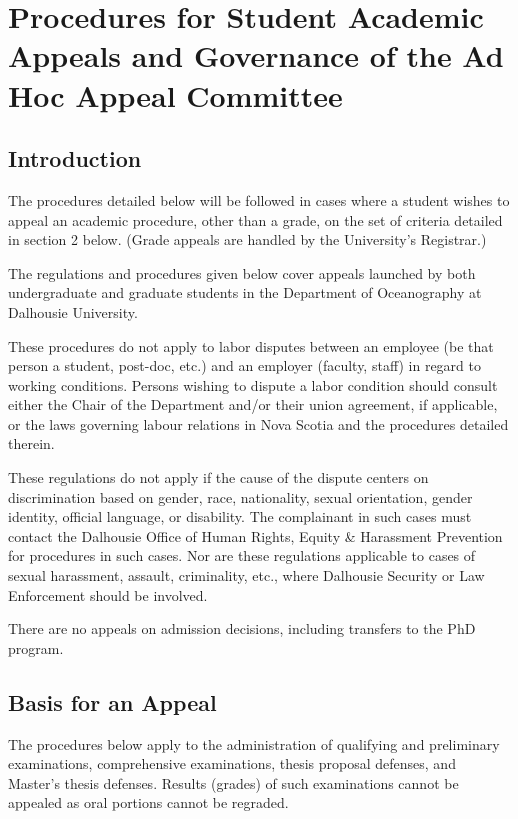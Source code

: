 \section{Procedures for Student Academic Appeals and Governance of the Ad Hoc
Appeal Committee}

\subsection{Introduction}

 The procedures detailed below will be followed in cases where a
student wishes to appeal an academic procedure, other than a grade, on the set
of criteria detailed in section 2 below. (Grade appeals are handled by the
University's Registrar.)

 The regulations and procedures given below cover appeals launched by
both undergraduate and graduate students in the Department of Oceanography at
Dalhousie University.  

 These procedures do not apply to labor disputes between an employee
(be that person a student, post-doc, etc.) and an employer (faculty, staff) in
regard to working conditions.  Persons wishing to dispute a labor condition
should consult either the Chair of the Department and/or their union agreement,
if applicable, or the laws governing labour relations in Nova Scotia and the
procedures detailed therein. 

 These regulations do not apply if the cause of the dispute centers
on discrimination based on gender, race, nationality, sexual orientation,
gender identity, official language, or disability.  The complainant in such
cases must contact the Dalhousie Office of Human Rights, Equity \& Harassment
Prevention for procedures in such cases.  Nor are these regulations applicable
to cases of sexual harassment, assault, criminality, etc., where Dalhousie
Security or Law Enforcement should be involved.  

 There are no appeals on admission decisions, including transfers to
the PhD program.  

\subsection{Basis for an Appeal}

 The procedures below apply to the administration of qualifying and
preliminary examinations, comprehensive examinations, thesis proposal defenses,
and Master's thesis defenses.  Results (grades) of such examinations cannot be
appealed as oral portions cannot be regraded.  

